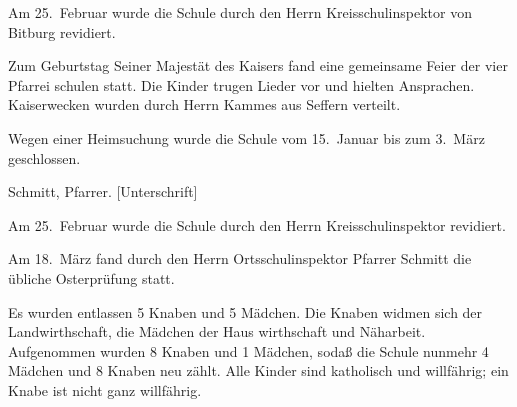 

\pstart
Am 25.\ Februar wurde die Schule durch\ob
den Herrn Kreisschulinspektor von Bitburg\ob
revidiert.

\pend
{}
\pstart

Zum Geburtstag Seiner Majestät des Kaisers\ob
fand eine gemeinsame Feier der vier Pfarrei\ohb
schulen statt. Die Kinder trugen Lieder\ob
vor und hielten Ansprachen. Kaiserwecken\ob
wurden durch Herrn Kammes\unsicher{} aus Seffern\ob
verteilt.

Wegen einer Heimsuchung wurde die Schule\ob
vom 15.\ Januar bis zum 3.\ März geschlossen.

\pend
{}
\pstart

Schmitt, Pfarrer. {[Unterschrift]}

\pend
{}
\pstart

Am 25.\ Februar wurde die Schule durch\ob
den Herrn Kreisschulinspektor revidiert.

\pend
{}
\pstart

Am 18.\ März fand durch den Herrn\ob
Ortsschulinspektor Pfarrer Schmitt die\ob
übliche Osterprüfung statt.

\pend
{}
\pstart

Es wurden entlassen 5 Knaben und 5\ob
Mädchen. Die Knaben widmen sich der\ob
Landwirthschaft, die Mädchen der Haus\ohb
wirthschaft und Näharbeit. Aufgenommen\ob
wurden 8 Knaben und 1 Mädchen, sodaß\ob
die Schule nunmehr 4 Mädchen und 8 Knaben\ob
neu zählt. Alle Kinder sind katholisch\ob
und willfährig; ein Knabe ist nicht ganz\ob
willfährig.
\pend
